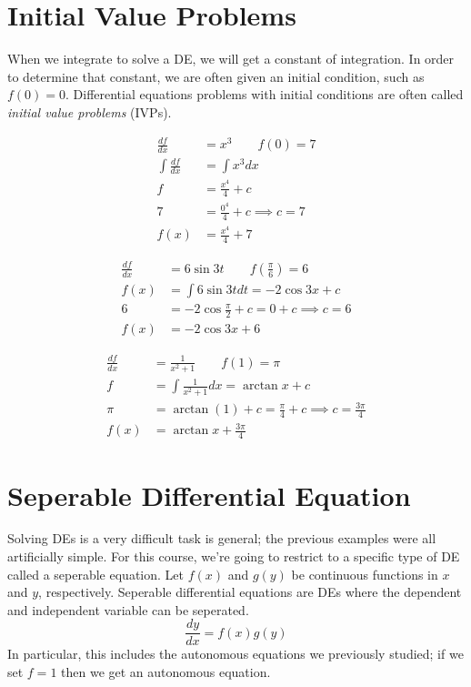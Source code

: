 \documentclass[fleqn]{report}
\begin{document}
\section*{Initial Value Problems}

When we integrate to solve a DE, we will get a constant of integration. 
In order to determine that constant, we are often
given an initial condition, such as $f(0) = 0$.  Differential
equations problems with initial conditions are often called
\emph{initial value problems} (IVPs).

\begin{example}
\begin{align*}
\frac{df}{dx} & = x^3 \quad \quad f(0) = 7 \\
\int \frac{df}{dx} & = \int x^3 dx \\
f & = \frac{x^4}{4} + c \\
7 & = \frac{0^4}{4} + c \implies c = 7 \\
f(x) & = \frac{x^4}{4} + 7 
\end{align*}
\end{example}

\begin{example}
\begin{align*}
\frac{df}{dx} & = 6 \sin 3t \quad \quad f \left( \frac{\pi}{6}
\right) = 6\\
f(x) & = \int 6 \sin 3t dt = -2\cos 3x + c \\
6 & = -2\cos \frac{\pi}{2} + c = 0 + c \implies c=6 \\
f(x) & = -2 \cos 3x + 6 
\end{align*}
\end{example}

\begin{example}
\begin{align*}
\frac{df}{dx} & = \frac{1}{x^2+1} \quad \quad f(1) = \pi \\
f & = \int \frac{1}{x^2+1} dx = \arctan x + c \\
\pi & = \arctan(1) + c = \frac{\pi}{4} + c \implies c =
\frac{3\pi}{4} \\
f(x) & = \arctan x + \frac{3\pi}{4} 
\end{align*}
\end{example}

\section*{Seperable Differential Equation}

Solving DEs is a very difficult task is general; the previous
examples were all artificially simple. For this course, we're
going to restrict to a specific type of DE called a seperable
equation. Let $f(x)$ and $g(y)$ be continuous functions in
$x$ and $y$, respectively. Seperable differential equations
are DEs where the dependent and independent variable can be
seperated.
\begin{equation*}
\frac{dy}{dx} = f(x) g(y)
\end{equation*}
In particular, this includes the autonomous equations we
previously studied; if we set $f=1$ then we get an autonomous
equation.
\end{document}

